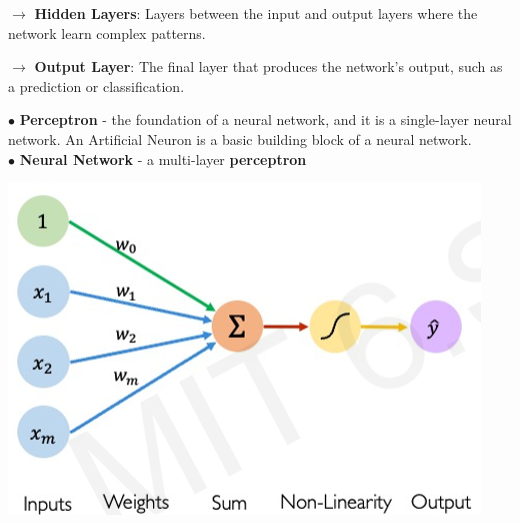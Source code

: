 \documentclass[letterpaper, 10.5pt,landscape]{article}
\begin{document}
\begin{multicols*}{3}
$\rightarrow$ \textbf{Hidden Layers}: Layers between the input and output layers where the network learn complex patterns.

$\rightarrow$ \textbf{Output Layer}: The final layer that produces the network's output, such as a prediction or classification.

$\bullet$ \textbf{Perceptron} - the foundation of a neural network, and it is a single-layer neural network. An Artificial Neuron is a basic building block of a neural network. \\

$\bullet$ \textbf{Neural Network} - a multi-layer \textbf{perceptron} 

\vspace{-5pt}
\begin{center}
    \begin{minipage}{0.6\linewidth}
    \includegraphics[width=\textwidth]{figures/perceptron_artificial_neuron.png}
    \end{minipage}
\end{center}



\end{multicols*}
\end{document}
